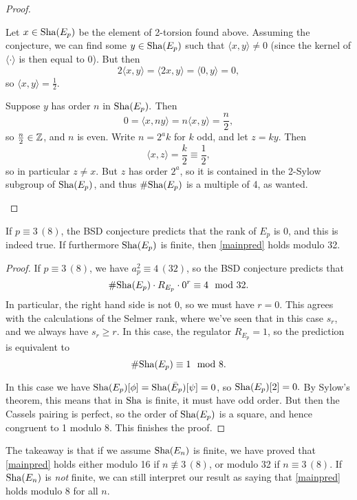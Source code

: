 \documentclass[12pt, a4paper]{report}
\begin{document}
\begin{proof}
\begin{itemize}
    Let $x \in \text{\normalfont Sha}(E_p)$ be the element of 2-torsion found above. Assuming the
    conjecture, we can find some $y \in \text{\normalfont Sha}(E_p)$ such that $\langle x,y \rangle \neq 0$
    (since the kernel of $\langle \cdot \rangle$ is then equal to 0). But then
    \[2 \langle x,y \rangle = \langle 2x,y \rangle = \langle 0, y \rangle = 0,\]
    so $\langle x,y \rangle = \frac{1}{2}.$
    
    Suppose $y$ has order $n$ in $\text{\normalfont Sha}(E_p).$ Then
    \[0 = \langle x,ny \rangle = n \langle x,y \rangle = \frac{n}{2},\]
    so $\frac{n}{2} \in {\mathbb Z}$, and $n$ is even. Write $n = 2^a k$ for $k$ odd,
    and let $z = ky$. Then
    \[\langle x,z \rangle = \frac{k}{2} \equiv \frac{1}{2},\]
    so in particular $z \neq x$. But $z$ has order $2^a$, so it is contained in
    the 2-Sylow subgroup of $\text{\normalfont Sha}(E_p)$, and thus $\# \text{\normalfont Sha}(E_p)$ is a multiple
    of 4, as wanted.

  \end{itemize}
\end{proof}

\begin{thm} \label{mainthm1}
  If $p \equiv 3 \, (8)$, the BSD conjecture predicts
  that the rank of $E_p$ is 0, and this is indeed true. If furthermore $\text{\normalfont Sha}(E_p)$ is
  finite, then \autoref{mainpred} holds modulo 32.
\end{thm}

\begin{proof}
  If $p \equiv 3 \, (8)$, we have $a_p^2 \equiv 4 \, (32)$, 
  so the BSD conjecture predicts that
  \[\# \text{\normalfont Sha}(E_p) \cdot R_{E_p} \cdot 0^r \equiv 4 \mod{32}.\]
  In particular, the right hand side is not 0, so we must have $r = 0$. This
  agrees with the calculations of the Selmer rank, where we've seen that in this
  case $s_r$, and we always have $s_r \geq r.$ In this case, the regulator
  $R_{E_p} = 1$, so the prediction is equivalent to
  \[\# \text{\normalfont Sha}(E_p) \equiv 1 \mod{8}.\] 

  In this case we have $\text{\normalfont Sha}(E_p)[\phi] = \text{\normalfont Sha}(\bar{E}_p)[\psi] = 0$, so
  $\text{\normalfont Sha}(E_p)[2] = 0.$ By Sylow's theorem, this means that in $\text{\normalfont Sha}$ is finite,
  it must have odd order. But then the Cassels pairing is perfect, so the order
  of $\text{\normalfont Sha}(E_p)$ is a square, and hence congruent to 1 modulo 8. This finishes
  the proof.
\end{proof}

The takeaway is that if we assume $\text{\normalfont Sha}(E_n)$ is finite, we have proved that
\autoref{mainpred} holds either modulo 16 if $n \not\equiv 3 \, (8)$, or modulo 32
if $n \equiv 3 \, (8)$. If $\text{\normalfont Sha}(E_n)$ is \textit{not} finite, we can still
interpret our result as saying that \autoref{mainpred} holds modulo 8 for all $n$.

\nocite{*}
\printbibliography[heading=bibintoc]
\end{document}
